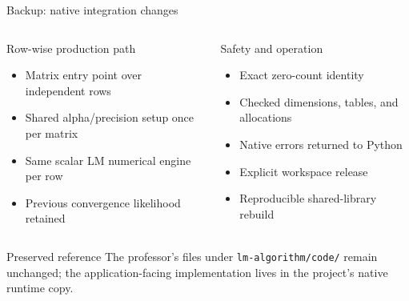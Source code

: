 \documentclass[aspectratio=169,10pt]{beamer}
\begin{document}
\begin{frame}{Backup: native integration changes}
\begin{columns}[T,onlytextwidth]
\begin{block}{Row-wise production path}
\begin{itemize}
  \item Matrix entry point over independent rows
  \item Shared alpha/precision setup once per matrix
  \item Same scalar LM numerical engine per row
  \item Previous convergence likelihood retained
\end{itemize}
\end{block}

\begin{block}{Safety and operation}
\begin{itemize}
  \item Exact zero-count identity
  \item Checked dimensions, tables, and allocations
  \item Native errors returned to Python
  \item Explicit workspace release
  \item Reproducible shared-library rebuild
\end{itemize}
\end{block}
\end{columns}

\begin{alertblock}{Preserved reference}
The professor's files under \texttt{lm-algorithm/code/} remain unchanged; the
application-facing implementation lives in the project's native runtime copy.
\end{alertblock}
\end{frame}
\end{document}
